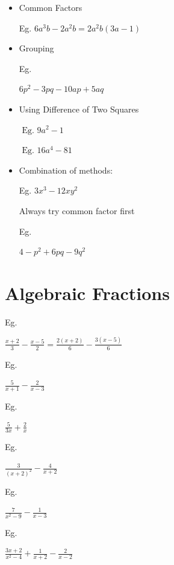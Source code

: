 \documentclass[twocolumn]{article}
\begin{document}
\begin{itemize} 
\item Common Factors

Eg. $6 a^3 b-2 a^2 b=2 a^2 b(3 a-1)$

\item Grouping

Eg.

$ 6 p^2-3 p q-10 a p+5 a q $

\item Using Difference of Two Squares

$ \text { Eg. } 9 a^2-1 $

\noindent 
$ \text { Eg. } 16 a^4-81 $

\item Combination of methods:

Eg. $3 x^3-12 x y^2$
 

Always try common factor first

Eg.

$ 4 - p^2 + 6pq - 9q^2  $

\end{itemize} 

\newpage 

\section*{Algebraic Fractions}

\noindent 
Eg.

\noindent 
$ \frac{x+2}{3}-\frac{x-5}{2}=\frac{2(x+2)}{6}-\frac{3(x-5)}{6} $

\bigskip 

\noindent 
Eg.

\noindent 
$ \frac{5}{x+1}-\frac{2}{x-3} $

\bigskip 

\noindent 
Eg.

\noindent 
$ \frac{5}{3 x}+\frac{2}{x} $

\bigskip 

\noindent 
Eg. 

\noindent 
$ \frac{3}{(x+2)^2}-\frac{4}{x+2} $

\bigskip 

\noindent 
Eg. 

\noindent 
$ \frac{7}{x^2-9}-\frac{1}{x-3} $

\bigskip 

\noindent 
Eg. 

\noindent 
$  \frac{3 x+2}{x^2-4}+\frac{1}{x+2}-\frac{2}{x-2}  $
\end{document}
